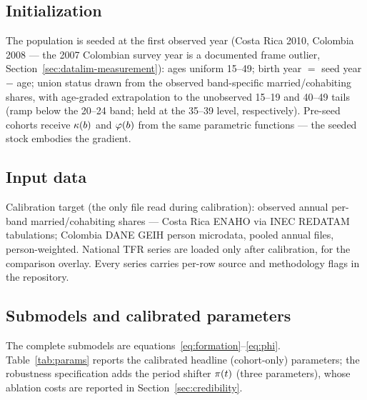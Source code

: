 \subsection{Initialization}

The population is seeded at the first observed year (Costa Rica 2010, Colombia
2008 --- the 2007 Colombian survey year is a documented frame outlier,
Section~\ref{sec:datalim-measurement}): ages uniform 15--49; birth year $=$
seed year $-$ age; union status drawn from the observed band-specific
married/cohabiting shares, with age-graded extrapolation to the unobserved
15--19 and 40--49 tails (ramp below the 20--24 band; held at the 35--39 level,
respectively). Pre-seed cohorts receive $\kappa(b)$ and $\varphi(b)$ from the same
parametric functions --- the seeded stock embodies the gradient.

\subsection{Input data}

Calibration target (the only file read during calibration): observed annual
per-band married/cohabiting shares --- Costa Rica ENAHO via INEC REDATAM
tabulations; Colombia DANE GEIH person microdata, pooled annual files,
person-weighted. National TFR series are loaded only after calibration, for
the comparison overlay. Every series carries per-row source and methodology
flags in the repository.

\subsection{Submodels and calibrated parameters}

The complete submodels are
equations~\eqref{eq:formation}--\eqref{eq:phi}. Table~\ref{tab:params} reports
the calibrated headline (cohort-only) parameters; the robustness specification
adds the period shifter $\pi(t)$ (three parameters), whose ablation costs are
reported in Section~\ref{sec:credibility}.

